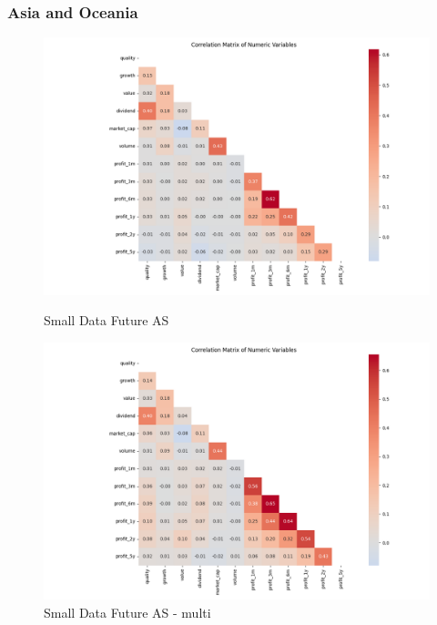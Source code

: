 \documentclass[11pt,english,a4paper,hidelinks]{book}
\begin{document}
\subsubsection{Asia and Oceania}
\begin{figure}[H]
    \centering
    \begin{minipage}{0.48\textwidth}
        \centering
        \includegraphics[width=\linewidth]{images/code/descriptive analysis/correlations/Small Data future AS.png}
        \caption{Small Data Future AS}
        \label{fig:small_data_future_as_correlations}
    \end{minipage}
    \begin{minipage}{0.48\textwidth}
        \centering
        \includegraphics[width=\linewidth]{images/code/descriptive analysis/correlations/Small Data future AS - Multi.png}
        \caption{Small Data Future AS - \acrshort{multi}}
        \label{fig:small_data_future_as_multi_correlations}
    \end{minipage}
\end{figure}
\end{document}
